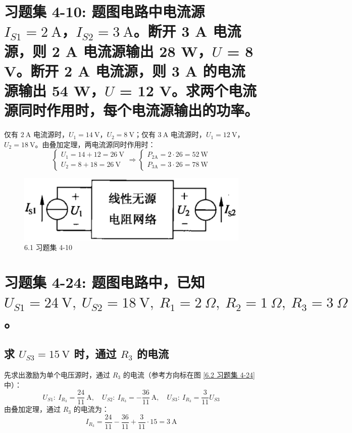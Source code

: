 \documentclass[UTF8]{report}
\theoremstyle{MyLineTheoremStyle} %
\theoremstyle{MyBlockTheoremStyle} %
\theoremstyle{MySubsubsectionStyle} %
\begin{document}
\section{习题集 4-10: 题图电路中电流源 $I_{S1} = 2 \ \mathrm{A}$，$I_{S2}= 3 \ \mathrm{A}$。断开 3 A 电流源，则 2 A 电流源输出 28 W，$U$ = 8 V。断开 2 A 电流源，则 3 A 的电流源输出 54 W，$U$ = 12 V。求两个电流源同时作用时，每个电流源输出的功率。}

仅有 $2 \ \mathrm{A}$ 电流源时，$U_1 = 14 \ \mathrm{V}$，$U_2 = 8 \ \mathrm{V}$；仅有 $3 \ \mathrm{A}$ 电流源时，$U_1 = 12 \ \mathrm{V}$，$U_2 = 18 \ \mathrm{V}$。由叠加定理，两电流源同时作用时：
\begin{equation}
\begin{cases}
    U_1 = 14 + 12 = 26 \ \mathrm{V} \\ 
    U_2 = 8 + 18 = 26 \ \mathrm{V}
\end{cases}
\Longrightarrow 
\boxed{
    \begin{cases}
        P_{2\mathrm{A}} = 2 \cdot 26 = 52 \ \mathrm{W} \\ 
        P_{3\mathrm{A}} = 3 \cdot 26 = 78 \ \mathrm{W}
    \end{cases}
}
\end{equation}
\begin{figure}[H]\centering
\includegraphics[width=0.4\columnwidth]{assets/6/9506aa8f7aeba32072fee006fa1076c7.png}
\caption{ 6.1 习题集 4-10}\label{6.1 习题集 4-10}
\end{figure}

\section{习题集 4-24: 题图电路中，已知 $U_{S1} = 24 \ \mathrm{V},\  U_{S2} = 18 \ \mathrm{V},\ R_1 = 2 \ \Omega,\ R_2 = 1 \ \Omega,\ R_3 = 3 \ \Omega$。}

\subsection{求 $U_{S3} = 15 \ \mathrm{V}$ 时，通过 $R_3$ 的电流}

先求出激励为单个电压源时，通过 $R_3$ 的电流（参考方向标在图 \ref{6.2 习题集 4-24} 中）：
\begin{equation}
U_{S1}:\ I_{R_3} = \frac{24}{11} \ \mathrm{A} ,\quad U_{S2}:\ I_{R_3} = -\frac{36}{11} \ \mathrm{A},\quad U_{S3}:\ I_{R_3} = \frac{3}{11} U_{S3}
\end{equation}
由叠加定理，通过 $R_3$ 的电流为：
\begin{equation}
\boxed{
    I_{R_3} = \frac{24}{11} - \frac{36}{11} + \frac{3}{11} \cdot 15 = 3 \ \mathrm{A}
}
\end{equation}
\end{document}
